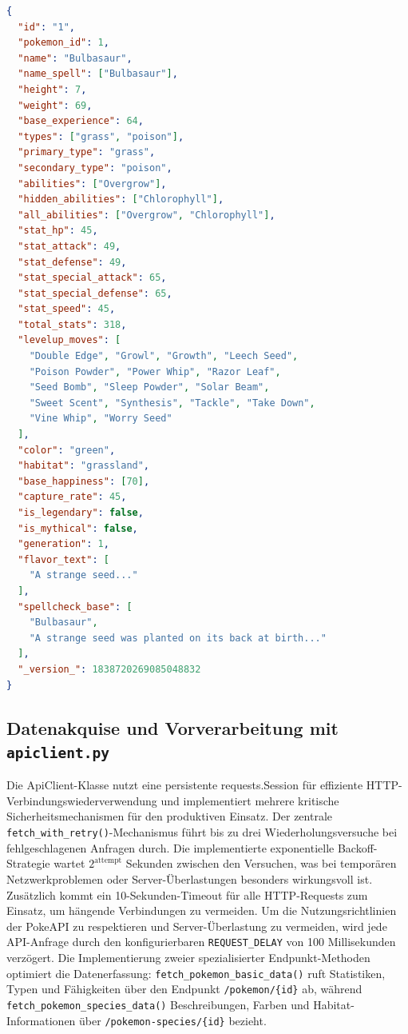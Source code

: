 \noindent
\begin{minipage}{\linewidth}
\begin{lstlisting}[language=json, caption=Beispiel eines indexierten Pokemon-Dokuments in Solr, label=lst:solr_document, basicstyle=\footnotesize\ttfamily, breaklines=true]
{
  "id": "1",
  "pokemon_id": 1,
  "name": "Bulbasaur",
  "name_spell": ["Bulbasaur"],
  "height": 7,
  "weight": 69,
  "base_experience": 64,
  "types": ["grass", "poison"],
  "primary_type": "grass",
  "secondary_type": "poison",
  "abilities": ["Overgrow"],
  "hidden_abilities": ["Chlorophyll"],
  "all_abilities": ["Overgrow", "Chlorophyll"],
  "stat_hp": 45,
  "stat_attack": 49,
  "stat_defense": 49,
  "stat_special_attack": 65,
  "stat_special_defense": 65,
  "stat_speed": 45,
  "total_stats": 318,
  "levelup_moves": [
    "Double Edge", "Growl", "Growth", "Leech Seed", 
    "Poison Powder", "Power Whip", "Razor Leaf", 
    "Seed Bomb", "Sleep Powder", "Solar Beam", 
    "Sweet Scent", "Synthesis", "Tackle", "Take Down", 
    "Vine Whip", "Worry Seed"
  ],
  "color": "green",
  "habitat": "grassland",
  "base_happiness": [70],
  "capture_rate": 45,
  "is_legendary": false,
  "is_mythical": false,
  "generation": 1,
  "flavor_text": [
    "A strange seed..."
  ],
  "spellcheck_base": [
    "Bulbasaur",
    "A strange seed was planted on its back at birth..."
  ],
  "_version_": 1838720269085048832
}
\end{lstlisting}
\label{fig:language-distribution}

\end{minipage}

\subsection{Datenakquise und Vorverarbeitung mit \texttt{api\textunderscore client.py}}
\label{sec:datenakquise}

Die ApiClient-Klasse nutzt eine persistente requests.Session für effiziente HTTP-Verbindungswiederverwendung und implementiert 
mehrere kritische Sicherheitsmechanismen für den produktiven Einsatz.
Der zentrale \texttt{fetch\_with\_retry()}-Mechanismus führt bis zu drei Wiederholungsversuche bei fehlgeschlagenen Anfragen durch. Die implementierte exponentielle Backoff-Strategie wartet $2^{\text{attempt}}$ Sekunden zwischen den Versuchen, was bei temporären Netzwerkproblemen oder Server-Überlastungen besonders wirkungsvoll ist. Zusätzlich kommt ein 10-Sekunden-Timeout für alle HTTP-Requests zum Einsatz, um hängende Verbindungen zu vermeiden.
Um die Nutzungsrichtlinien der PokeAPI zu respektieren und Server-Überlastung zu vermeiden, wird jede API-Anfrage durch den konfigurierbaren \texttt{REQUEST\_DELAY} von 100 Millisekunden verzögert. Die Implementierung zweier spezialisierter Endpunkt-Methoden optimiert die Datenerfassung: \texttt{fetch\_pokemon\_basic\_data()} ruft Statistiken, Typen und Fähigkeiten über den Endpunkt \texttt{/pokemon/\{id\}} ab, während \texttt{fetch\_pokemon\_species\_data()} Beschreibungen, Farben und Habitat-Informationen über \texttt{/pokemon-species/\{id\}} bezieht.

